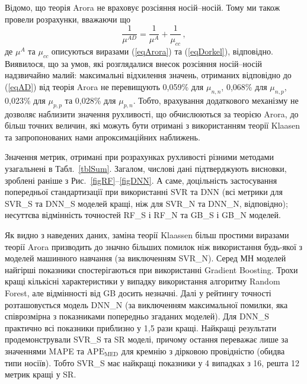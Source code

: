 \documentclass[14pt,a4paper,titlepage,oneside]{book}
\numberwithin{equation}{part}
\begin{document}
Відомо, що теорія Arora не враховує розсіяння носій--носій.
Тому ми також провели розрахунки, вважаючи що
\begin{equation}\label{eqAD}
  \frac{1}{\mu^{AD}}= \frac{1}{\mu^A}+\frac{1}{\mu_{cc}}\,,
\end{equation}
де
$\mu^A$ та $\mu_{cc}$ описуються виразами (\ref{eqArora}) та (\ref{eqDorkel}), відповідно.
Виявилося, що за умов, які розглядалися внесок розсіяння носій--носій надзвичайно малий:
максимальні відхилення значень, отриманих відповідно до (\ref{eqAD}) від теорія Arora
не перевищують 0,059\% для $\mu_{n,n}$, 0,068\% для $\mu_{n,p}$, 0,023\% для $\mu_{p,p}$ та
0,028\% для $\mu_{p,n}$.
Тобто, врахування додаткового механізму не дозволяє наблизити значення рухливості,
що обчислюються за теорією Arora, до більш точних величин, які можуть бути отримані з використанням теорії Klaasen
та запропонованих нами апроксимаційних наближень.

Значення метрик, отримані при розрахунках рухливості різними методами узагальнені в Табл.~\ref{tblSum}.
Загалом, числові дані підтверджують висновки, зроблені раніше з Рис.~\ref{figRF}--\ref{figDNN}.
А саме, доцільність застосування попередньої стандартизації при використанні SVR та DNN
(всі метрики для SVR\_S  та DNN\_S моделей кращі, ніж для SVR\_N  та DNN\_N, відповідно);
несуттєва відмінність точностей RF\_S  і RF\_N та  GB\_S  і GB\_N моделей.

Як видно з наведених даних, заміна теорії Klaassen більш простими виразами теорії Arora 
призводить до значно більших помилок ніж використання будь-якої з моделей машинного навчання
(за виключенням SVR\_N).
Серед МН моделей найгірші показники спостерігаються при використанні Gradient Boosting.
Трохи кращі кількісні характеристики у випадку використання алгоритму Random Forest,
але відмінності від GB досить незначні.
Далі у рейтингу точності розташовується модель DNN\_N (за виключенням максимальної помилки, яка співрозмірна з 
показниками попередньо згаданих моделей).
Для DNN\_S практично всі показники приблизно у 1,5 рази кращі.
Найкращі результати продемонстрували SVR\_S та SR моделі, причому остання переважає
лише за значеннями MAPE та $\mathrm{APE}_\mathrm{MED}$ для кремнію з дірковою провідністю
(обидва типи носіїв).
Тобто SVR\_S має найкращі показники у 4 випадках з 16,
решта 12 метрик кращі у SR.
\end{document}
